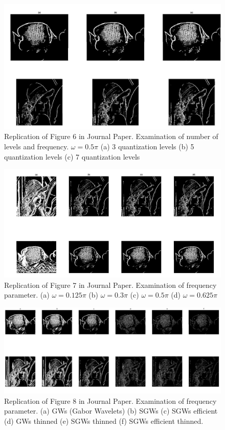 \documentclass[./rarnold_final_project.tex]{subfiles}
\begin{document}
	\begin{figure}[!htbp]
	\centering
	\includegraphics[scale=0.35]{"level_freq2"}
	\captionsetup{justification=centering}
	\caption{Replication of Figure 6 in Journal Paper.  Examination of number of levels and frequency. $\omega=0.5\pi$ (a) 3 quantization levels (b) 5 quantization levels (c) 7 quantization levels \cite{main}} 
	\label{level_freq2}
	\end{figure}
	
	\begin{figure}[!htbp]
	\centering
	\includegraphics[scale=0.35]{"freq"}
	\captionsetup{justification=centering}
	\caption{Replication of Figure 7 in Journal Paper. Examination of frequency parameter. (a) $\omega=0.125\pi$ (b) $\omega=0.3\pi$ (c) $\omega=0.5\pi$ (d) $\omega=0.625\pi$ \cite{main}} 
	\label{freq}
	\end{figure}
	
	\clearpage
	
	\begin{figure}[!htbp]
	\centering
	\includegraphics[scale=0.35]{"thinned"}
	\captionsetup{justification=centering}
	\caption{Replication of Figure 8 in Journal Paper. Examination of frequency parameter. (a) GWs (Gabor Wavelets) (b) SGWs (c) SGWs efficient (d) GWs thinned (e) SGWs thinned (f) SGWs efficient thinned. \cite{main}} 
	\label{thin}
	\end{figure}	
	
\end{document}
